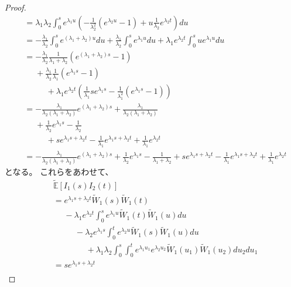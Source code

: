 \documentclass[uplatex]{jsarticle}
\theoremstyle{definition}
\def\E{\mathbb{E}}
\begin{document}
\begin{proof}
\begin{align*}
    &= \lambda_1\lambda_2 \int_0^s e^{\lambda_1u}
    \left(
    - \frac{1}{\lambda_2^2}\left( e^{\lambda_2u} - 1 \right)
    + u\frac{1}{\lambda_2}e^{\lambda_2t} \right) du \\
    &=
    - \frac{\lambda_1}{\lambda_2}\int_0^s e^{(\lambda_1+\lambda_2)u}du
    + \frac{\lambda_1}{\lambda_2}\int_0^s e^{\lambda_1u}du
    + \lambda_1e^{\lambda_2t} \int_0^s ue^{\lambda_1u}du \\
    &=
    - \frac{\lambda_1}{\lambda_2}
    \frac{1}{\lambda_1+\lambda_2}\left( e^{(\lambda_1+\lambda_2)s}-1\right) \\
    &\ \ \ \ \ \
    + \frac{\lambda_1}{\lambda_2}
    \frac{1}{\lambda_1}\left( e^{\lambda_1s} - 1\right) \\
    &\ \ \ \ \ \ \ \ \ \ \ \
    + \lambda_1e^{\lambda_2t} \left( \frac{1}{\lambda_1}se^{\lambda_1s}
    - \frac{1}{\lambda_1^2}\left( e^{\lambda_1s} - 1 \right)\right) \\
    &=
    - \frac{\lambda_1}{\lambda_2(\lambda_1+\lambda_2)}e^{(\lambda_1+\lambda_2)s}
    + \frac{\lambda_1}{\lambda_2(\lambda_1+\lambda_2)} \\
    &\ \ \ \ \ \
    + \frac{1}{\lambda_2}e^{\lambda_1s} - \frac{1}{\lambda_2} \\
    &\ \ \ \ \ \ \ \ \ \ \ \
    + se^{\lambda_1s+\lambda_2t}
    - \frac{1}{\lambda_1}e^{\lambda_1s+\lambda_2t}
    + \frac{1}{\lambda_1}e^{\lambda_2t} \\
    &=
    - \frac{\lambda_1}{\lambda_2(\lambda_1+\lambda_2)}e^{(\lambda_1+\lambda_2)s}
    + \frac{1}{\lambda_2}e^{\lambda_1s}
    - \frac{1}{\lambda_1+\lambda_2}
    + se^{\lambda_1s+\lambda_2t}
    - \frac{1}{\lambda_1}e^{\lambda_1s+\lambda_2t}
    + \frac{1}{\lambda_1}e^{\lambda_2t}
  \end{align*}
  となる。
  これらをあわせて、
  \begin{align*}
    &\tilde{\E}[I_1(s)I_2(t)] \\
    &= e^{\lambda_1s+\lambda_2t}\tilde{W}_1(s)\tilde{W}_1(t) \\
    &\ \ \ \ \ \
    - \lambda_1e^{\lambda_2t}\int_0^s
    e^{\lambda_1u}\tilde{W}_1(t)\tilde{W}_1(u)du \\
    &\ \ \ \ \ \ \ \ \ \ \ \
    - \lambda_2e^{\lambda_1s}\int_0^t
    e^{\lambda_2u}\tilde{W}_1(s)\tilde{W}_1(u)du \\
    &\ \ \ \ \ \ \ \ \ \ \ \ \ \ \ \ \ \
    + \lambda_1\lambda_2\int_0^s\int_0^t
    e^{\lambda_1u_1}e^{\lambda_2u_2}\tilde{W}_1(u_1)\tilde{W}_1(u_2)du_2du_1 \\
    &= se^{\lambda_1s+\lambda_2t} \\

\end{align*}
\end{proof}
\end{document}

